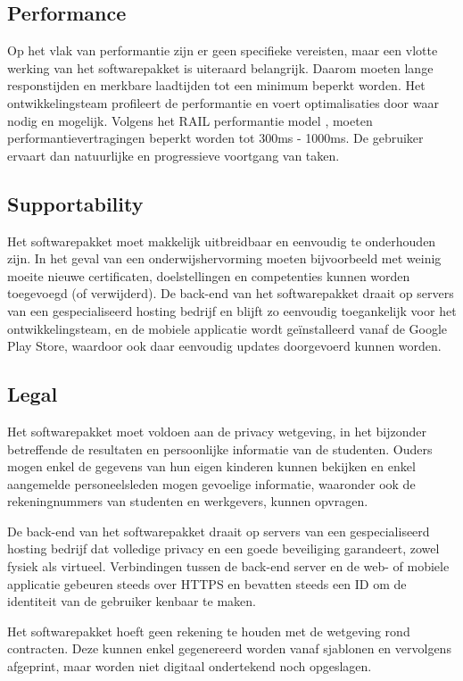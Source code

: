 \documentclass[a4paper]{article}
\begin{document}
\subsection{Performance}
Op het vlak van performantie zijn er geen specifieke vereisten, maar een vlotte werking van het softwarepakket is uiteraard belangrijk. Daarom moeten lange responstijden en merkbare laadtijden tot een minimum beperkt worden. Het ontwikkelingsteam profileert de performantie en voert optimalisaties door waar nodig en mogelijk. Volgens het RAIL performantie model \cite{RAIL}, moeten performantievertragingen beperkt worden tot 300ms - 1000ms. De gebruiker ervaart dan natuurlijke en progressieve voortgang van taken.


\subsection{Supportability}
Het softwarepakket moet makkelijk uitbreidbaar en eenvoudig te onderhouden zijn. In het geval van een onderwijshervorming moeten bijvoorbeeld met weinig moeite nieuwe certificaten, doelstellingen en competenties kunnen worden toegevoegd (of verwijderd). De back-end van het softwarepakket draait op servers van een gespecialiseerd hosting bedrijf en blijft zo eenvoudig toegankelijk voor het ontwikkelingsteam, en de mobiele applicatie wordt geïnstalleerd vanaf de Google Play Store, waardoor ook daar eenvoudig updates doorgevoerd kunnen worden.


\subsection{Legal}
Het softwarepakket moet voldoen aan de privacy wetgeving, in het bijzonder betreffende de resultaten en persoonlijke informatie van de studenten. Ouders mogen enkel de gegevens van hun eigen kinderen kunnen bekijken en enkel aangemelde personeelsleden mogen gevoelige informatie, waaronder ook de rekeningnummers van studenten en werkgevers, kunnen opvragen.

De back-end van het softwarepakket draait op servers van een gespecialiseerd hosting bedrijf dat volledige privacy en een goede beveiliging garandeert, zowel fysiek als virtueel. Verbindingen tussen de back-end server en de web- of mobiele applicatie gebeuren steeds over HTTPS en bevatten steeds een ID om de identiteit van de gebruiker kenbaar te maken.

Het softwarepakket hoeft geen rekening te houden met de wetgeving rond contracten. Deze kunnen enkel gegenereerd worden vanaf sjablonen en vervolgens afgeprint, maar worden niet digitaal ondertekend noch opgeslagen.
\end{document}
